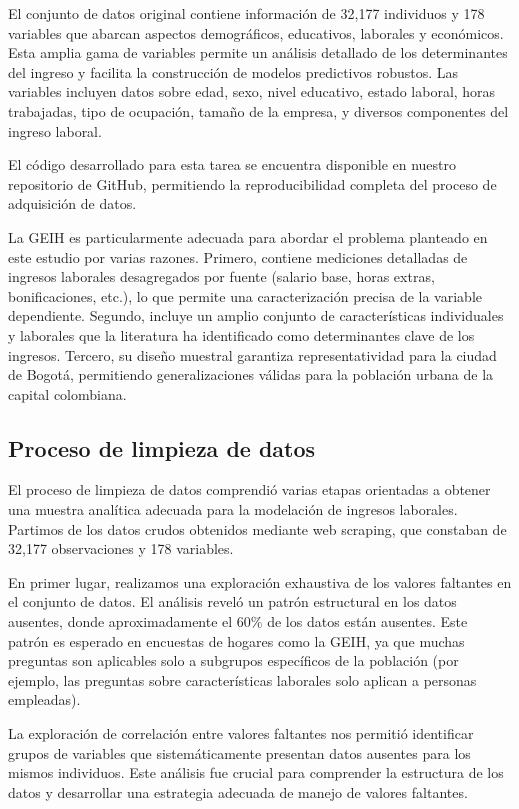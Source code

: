 \documentclass[12pt,a4paper,onecolumn]{article}
\begin{document}
El conjunto de datos original contiene información de 32,177 individuos y 178 variables que abarcan aspectos demográficos, educativos, laborales y económicos. Esta amplia gama de variables permite un análisis detallado de los determinantes del ingreso y facilita la construcción de modelos predictivos robustos. Las variables incluyen datos sobre edad, sexo, nivel educativo, estado laboral, horas trabajadas, tipo de ocupación, tamaño de la empresa, y diversos componentes del ingreso laboral.


El código desarrollado para esta tarea se encuentra disponible en nuestro repositorio de GitHub, permitiendo la reproducibilidad completa del proceso de adquisición de datos.


La GEIH es particularmente adecuada para abordar el problema planteado en este estudio por varias razones. Primero, contiene mediciones detalladas de ingresos laborales desagregados por fuente (salario base, horas extras, bonificaciones, etc.), lo que permite una caracterización precisa de la variable dependiente. Segundo, incluye un amplio conjunto de características individuales y laborales que la literatura ha identificado como determinantes clave de los ingresos. Tercero, su diseño muestral garantiza representatividad para la ciudad de Bogotá, permitiendo generalizaciones válidas para la población urbana de la capital colombiana.


\subsection{Proceso de limpieza de datos}

El proceso de limpieza de datos comprendió varias etapas orientadas a obtener una muestra analítica adecuada para la modelación de ingresos laborales. Partimos de los datos crudos obtenidos mediante web scraping, que constaban de 32,177 observaciones y 178 variables.


En primer lugar, realizamos una exploración exhaustiva de los valores faltantes en el conjunto de datos. El análisis reveló un patrón estructural en los datos ausentes, donde aproximadamente el 60\% de los datos están ausentes. Este patrón es esperado en encuestas de hogares como la GEIH, ya que muchas preguntas son aplicables solo a subgrupos específicos de la población (por ejemplo, las preguntas sobre características laborales solo aplican a personas empleadas).


La exploración de correlación entre valores faltantes nos permitió identificar grupos de variables que sistemáticamente presentan datos ausentes para los mismos individuos. Este análisis fue crucial para comprender la estructura de los datos y desarrollar una estrategia adecuada de manejo de valores faltantes.
\end{document}
